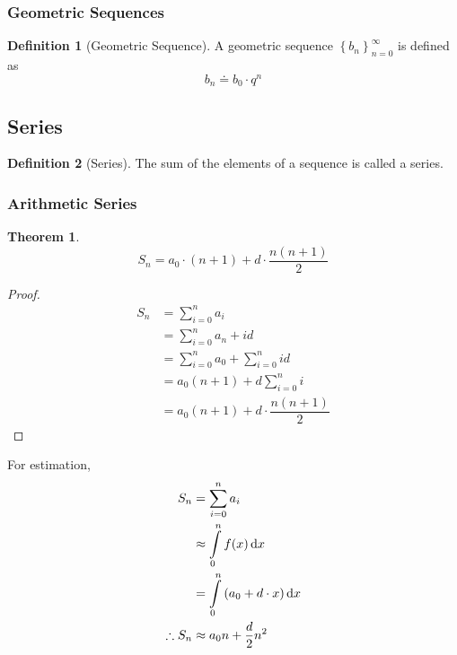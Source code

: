 \documentclass[fleqn, a4paper, 12pt, twoside]{article}
\theoremstyle{definition}
\newtheorem{definition}{Definition}
\theoremstyle{theorem}
\newtheorem{theorem}{Theorem}
\begin{document}
\subsubsection{Geometric Sequences}

\begin{definition}[Geometric Sequence]
	A geometric sequence $\left\{ b_n \right\}_{n = 0}^{\infty}$ is defined as
	\begin{equation*}
	b_n \doteq b_0 \cdot q^n
	\end{equation*}
\end{definition}

\subsection{Series}

\begin{definition}[Series]
	The sum of the elements of a sequence is called a series.
\end{definition}

\subsubsection{Arithmetic Series}

\begin{theorem}
	\begin{equation*}
		S_n = a_0 \cdot (n + 1) + d \cdot \dfrac{n (n + 1)}{2}
	\end{equation*}
\end{theorem}

\begin{proof}
	\begin{align*}
		S_n &= \sum_{i = 0}^{n} a_i\\
		&= \sum_{i = 0}^{n} a_n + i d\\
		&= \sum_{i = 0}^{n} a_0 + \sum_{i = 0}^{n} i d\\
		&= a_0 (n + 1) + d \sum_{i = 0}^{n} i\\
		&= a_0 (n + 1) + d \cdot \dfrac{n (n + 1)}{2}
	\end{align*}
\end{proof}

For estimation, 
\begin{align*}
	S_n &= \sum_{i = 0}^{n} a_i\\
	&\approx \int\limits_{0}^{n} f(x) \dif x\\
	&= \int\limits_{0}^{n} \left( a_0 + d \cdot x \right) \dif x\\
	\therefore S_n &\approx a_0 n + \dfrac{d}{2} n^2
\end{align*}
\end{document}
